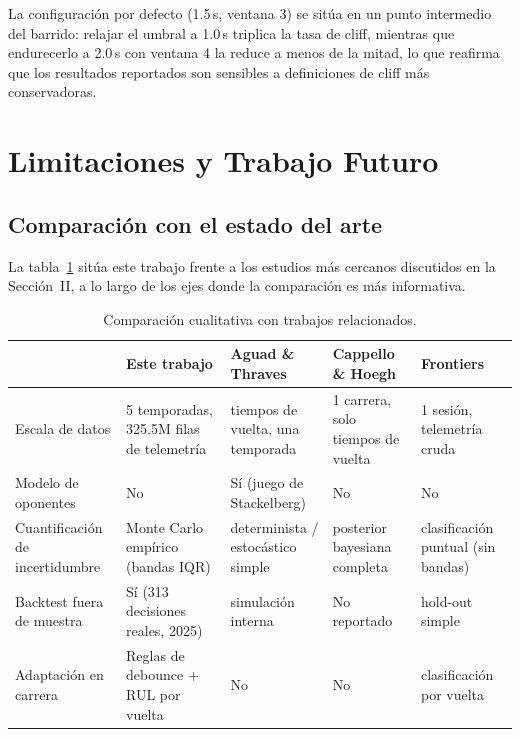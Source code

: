 \documentclass[conference]{IEEEtran}
\begin{document}
La configuración por defecto (1.5\,s, ventana 3) se sitúa en un punto
intermedio del barrido: relajar el umbral a 1.0\,s triplica la tasa de
cliff, mientras que endurecerlo a 2.0\,s con ventana 4 la reduce a menos
de la mitad, lo que reafirma que los resultados reportados son sensibles a
definiciones de cliff más conservadoras.

\section{Limitaciones y Trabajo Futuro}

\subsection{Comparación con el estado del arte}

La tabla~\ref{tab:sota} sitúa este trabajo frente a los estudios más
cercanos discutidos en la Sección~II, a lo largo de los ejes donde la
comparación es más informativa.

\begin{table}[!htbp]
\centering
\caption{Comparación cualitativa con trabajos relacionados.}
\label{tab:sota}
\small
\begin{tabular}{@{}p{2.6cm}p{3cm}p{2.6cm}p{2.6cm}p{2.6cm}@{}}
\toprule
 & \textbf{Este trabajo} & \textbf{Aguad \& Thraves~\cite{aguad2024}} &
\textbf{Cappello \& Hoegh~\cite{cappello2025tire}} &
\textbf{Frontiers~\cite{frontiers2025pitstop}} \\
\midrule
Escala de datos & 5 temporadas, 325.5M filas de telemetría & tiempos de vuelta, una temporada & 1 carrera, solo tiempos de vuelta & 1 sesión, telemetría cruda \\
Modelo de oponentes & No & Sí (juego de Stackelberg) & No & No \\
Cuantificación de incertidumbre & Monte Carlo empírico (bandas IQR) & determinista / estocástico simple & posterior bayesiana completa & clasificación puntual (sin bandas) \\
Backtest fuera de muestra & Sí (313 decisiones reales, 2025) & simulación interna & No reportado & hold-out simple \\
Adaptación en carrera & Reglas de debounce + RUL por vuelta & No & No & clasificación por vuelta \\
\bottomrule
\end{tabular}
\end{table}
\end{document}
